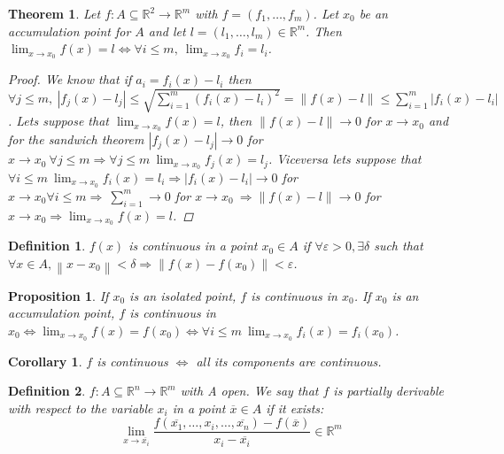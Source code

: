 \documentclass{article}
\newtheorem{theorem}{Theorem}
\newtheorem{corollary}{Corollary}
\newtheorem{definition}{Definition}
\newtheorem{proposition}{Proposition}
\begin{document}
            \begin{theorem}
                Let $f:A\subseteq \mathbb{R}^2 \rightarrow \mathbb{R}^m$ with $f=(f_1,\dots,f_m)$. Let $x_0$ be an accumulation point for $A$ and let $l = (l_1,\dots,l_m) \in \mathbb{R}^m$. Then $\lim_{x \to x_0}f(x) = l \Longleftrightarrow  \forall i \leq m, \ \lim_{x \to x_0}f_i = l_i$.
                \begin{proof}
                    We know that if $a_i = f_i(x) - l_i$ then $\forall j \leq m, \ \left\lvert f_j(x) - l_j\right\rvert \leq \sqrt{\sum_{i = 1}^{m} \left(f_i(x) - l_i\right)^2 } = \left\lVert f(x) - l\right\rVert \leq \sum_{i = 1}^{m} \left\lvert f_i(x) - l_i\right\rvert$. Lets suppose that $\lim_{x \to x_0} f(x) = l$, then $\left\lVert f(x) - l\right\rVert \to 0 $ for $x \to x_0$ and for the sandwich theorem $\left\lvert f_j (x) - l_j \right\rvert \to 0 $ for $x \to x_0 \ \forall j \leq m \Longrightarrow \forall j \leq m \ \lim_{x \to x_0 }f_j(x) = l_j$. Viceversa lets suppose that $\forall i \leq m \ \lim_{x \to x_0} f_i( x) = l_i \Rightarrow \left\lvert f_i (x) - l_i\right\rvert \to 0 $ for $x \to x_0 \forall i \leq m \Rightarrow \ \sum_{i = 1}^{m} \to 0$ for $x \to x_0 \ \Rightarrow \left\lVert f(x) - l\right\rVert \to 0 $ for $x \to x_0 \Rightarrow \lim_{x \to x_0}f(x) = l$.  
                \end{proof}
            \end{theorem}
            \begin{definition}
                $f(x)$ is continuous in a point $x_0 \in A$ if $\forall \varepsilon > 0, \exists \delta$ such that $\forall x \in A,  \left\lVert x - x_0\right\rVert < \delta \Rightarrow \left\lVert f(x) - f(x_0) \right\rVert < \varepsilon$.
            \end{definition}
            \begin{proposition}
                If $x_0$ is an isolated point, $f$ is continuous in $x_0$. If $x_0$ is an accumulation point, $f$ is continuous in $ x_0 \Longleftrightarrow \lim_{x \to x_0} f(x) = f(x_0) \Longleftrightarrow \forall i \leq m \ \lim_{x \to x_0} f_i(x) = f_i(x_0)$.   
            \end{proposition}
            \begin{corollary}
                $f$ is continuous $\Longleftrightarrow$ all its components are continuous.
            \end{corollary}
            \begin{definition}
                $f: A \subseteq \mathbb{R}^n \rightarrow \mathbb{R}^m$ with A open. We say that $f$ is partially derivable with respect to the variable $x_i$ in a point $\overline{x} \in A$ if it exists:
                \begin{equation*}
                    \lim_{x \to \overline{x_i}} \frac{f(\overline{x_1},\dots,x_i,\dots,\overline{x_n}) - f(\overline{x})}{x_i - \overline{x_i}} \in \mathbb{R}^m
                \end{equation*} 
            \end{definition}
\end{document}
